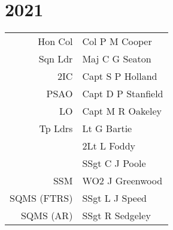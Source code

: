\chapter*{2021}

\vspace*{10mm}

\begin{center}
  \small
  \begin{tabular}{rl}
    Hon Col & Col P M Cooper \\
    Sqn Ldr & Maj C G Seaton \\
    2IC & Capt S P Holland \\
    PSAO & Capt D P Stanfield \\
    LO & Capt M R Oakeley \\
    Tp Ldrs & Lt G Bartie \\
      & 2Lt L Foddy \\
      & SSgt C J Poole \\
    SSM & WO2 J Greenwood \\
    SQMS (FTRS) & SSgt L J Speed \\
    SQMS (AR) & SSgt R Sedgeley \\
  \end{tabular}
\end{center}

\vspace*{5mm}

